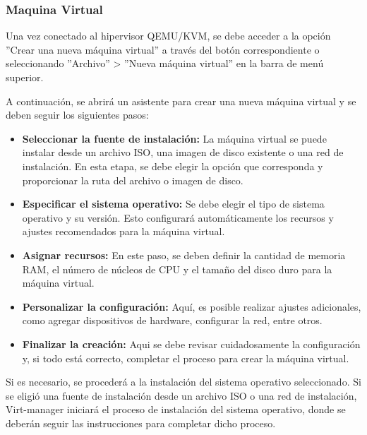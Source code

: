 	
			\subsubsection{Maquina Virtual}
			
			Una vez conectado al hipervisor QEMU/KVM, se debe acceder a la opción ''Crear una nueva máquina virtual'' a través del botón correspondiente o seleccionando ''Archivo'' > ''Nueva máquina virtual'' en la barra de menú superior.
			
			A continuación, se abrirá un asistente para crear una nueva máquina virtual y se deben seguir los siguientes pasos:
			
			\begin{itemize}
			
				\item \textbf{Seleccionar la fuente de instalación:} La máquina virtual se puede instalar desde un archivo ISO, una imagen de disco existente o una red de instalación. En esta etapa, se debe elegir la opción que corresponda y proporcionar la ruta del archivo o imagen de disco.
			
				\item \textbf{Especificar el sistema operativo:} Se debe elegir el tipo de sistema operativo y su versión. Esto configurará automáticamente los recursos y ajustes recomendados para la máquina virtual.
			
				\item \textbf{Asignar recursos:} En este paso, se deben definir la cantidad de memoria RAM, el número de núcleos de CPU y el tamaño del disco duro para la máquina virtual.
			
				\item \textbf{Personalizar la configuración:} Aquí, es posible realizar ajustes adicionales, como agregar dispositivos de hardware, configurar la red, entre otros.
			
				\item \textbf{Finalizar la creación:} Aqui se debe revisar cuidadosamente la configuración y, si todo está correcto, completar el proceso para crear la máquina virtual.
			
			\end{itemize}
	
			Si es necesario, se procederá a la instalación del sistema operativo seleccionado. Si se eligió una fuente de instalación desde un archivo ISO o una red de instalación, Virt-manager iniciará el proceso de instalación del sistema operativo, donde se deberán seguir las instrucciones para completar dicho proceso.
			
